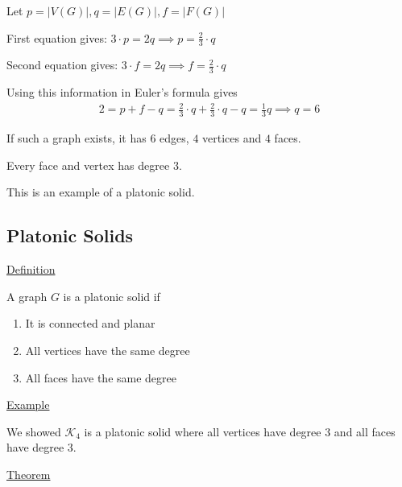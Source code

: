 \documentclass{article}
\begin{document}
Let $p = |V(G)|, q = |E(G)|, f = |F(G)|$

First equation gives: $3 \cdot p = 2q \implies p = \frac{2}{3} \cdot q$

Second equation gives: $3 \cdot f = 2q \implies f = \frac{2}{3} \cdot q$

Using this information in Euler's formula gives
\begin{align*}
    2 = p + f - q = \frac{2}{3} \cdot q + \frac{2}{3} \cdot q - q = \frac{1}{3}q \implies q = 6
\end{align*}

If such a graph exists, it has $6$ edges, $4$ vertices and $4$ faces. 

\begin{center}
\end{center}

Every face and vertex has degree $3$. 

This is an example of a platonic solid. 

\subsection{Platonic Solids}

\underline{Definition}

A graph $G$ is a platonic solid if 
\begin{enumerate}
    \item It is connected and planar
    \item All vertices have the same degree
    \item All faces have the same degree
\end{enumerate}

\underline{Example}

We showed $\mathcal{K}_4$ is a platonic solid where all vertices have degree $3$ and all faces have degree $3$. 

\underline{Theorem}
\end{document}
